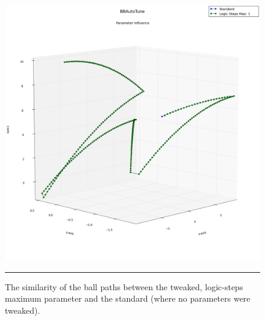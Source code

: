 \begin{figure}[htbp]
\centering
\includegraphics[scale=0.35]{../Figures/Chapter4/logic_steps_ball_plot.png}
\rule{35em}{0.5pt}
\caption[Physics Engine Racquetball Path Similarity]{The similarity of the ball paths between the tweaked, logic-steps maximum parameter and the standard (where no parameters were tweaked).}
\label{fig:logicstepsplot}
\end{figure}

